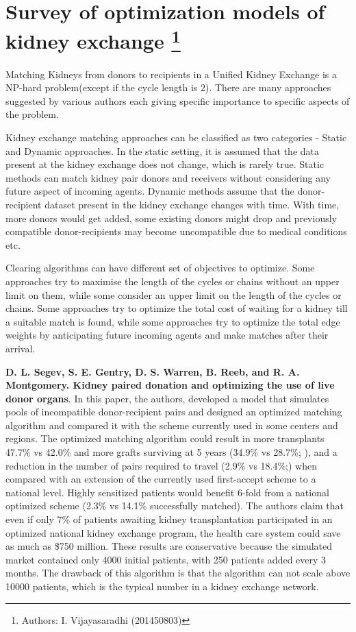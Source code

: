 \section[Survey of optimization models of kidney exchange] {Survey of optimization models of kidney exchange \protect\footnote{Authors: I. Vijayasaradhi (201450803) }}
Matching Kidneys from donors to recipients in a Unified Kidney Exchange is a NP-hard problem(except if the cycle length is 2). There are many approaches suggested by various authors each giving specific importance to specific aspects of the problem. 

Kidney exchange matching approaches can be classified as two categories - Static and Dynamic approaches. In the static setting, it is assumed that the data present at the kidney exchange does not change, which is rarely true. Static methods can match kidney pair donors and receivers without considering any future aspect of incoming agents. Dynamic methods assume that the donor-recipient dataset present in the kidney exchange changes with time. With time, more donors would get added, some existing donors might drop and previously compatible donor-recipients may become uncompatible due to medical conditions etc.
\par
Clearing algorithms can have different set of objectives to optimize. Some approaches try to maximise the length of the cycles or chains without an upper limit on them, while some consider an upper limit on the length of the cycles or chains. Some approaches try to optimize the total cost of waiting for a kidney till a suitable match is found, while some approaches try to optimize the total edge weights by anticipating future incoming agents and make matches after their arrival. 
\par
\textbf{D. L. Segev, S. E. Gentry, D. S. Warren, B. Reeb, and R. A. Montgomery. Kidney paired donation and optimizing the use of live donor organs}.\cite{vijay1}
In this paper, the authors, developed a model that simulates pools of incompatible donor-recipient pairs and designed an optimized matching algorithm and compared it with the scheme currently used in some centers and regions. The optimized matching algorithm could result in more transplants 47.7\% vs 42.0\% and more grafts surviving at 5 years (34.9\% vs 28.7\%; ), and a reduction in the number of pairs required to travel (2.9\% vs 18.4\%;) when compared with an extension of the currently used
first-accept scheme to a national level. Highly sensitized patients would benefit 6-fold from a national optimized scheme (2.3\% vs 14.1\% successfully matched). The authors claim that even if only 7\% of patients awaiting kidney transplantation participated in an optimized national kidney exchange program, the health care system could save as much as \$750 million. These results are conservative because the simulated market contained only 4000 initial patients, with 250 patients added every 3
months. The drawback of this algorithm is that the algorithm can not scale above 10000 patients, which is the typical number in a kidney exchange network.

